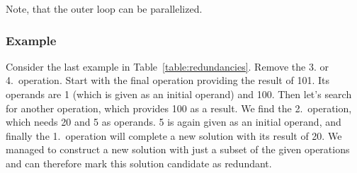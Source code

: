 \documentclass[english]{article}
\begin{document}
Note, that the outer loop can be parallelized.

\subsubsection{Example}

Consider the last example in Table~\ref{table:redundancies}. Remove the 3. or 4.~operation. Start with the final operation providing the result of 101. Its operands are 1 (which is given as an initial operand) and 100. Then let's search for another operation, which provides 100 as a result. We find the 2.~operation, which needs 20 and 5 as operands. 5 is again given as an initial operand, and finally the 1.~operation will complete a new solution with its result of 20. We managed to construct a new solution with just a subset of the given operations and can therefore mark this solution candidate as redundant.
\end{document}
